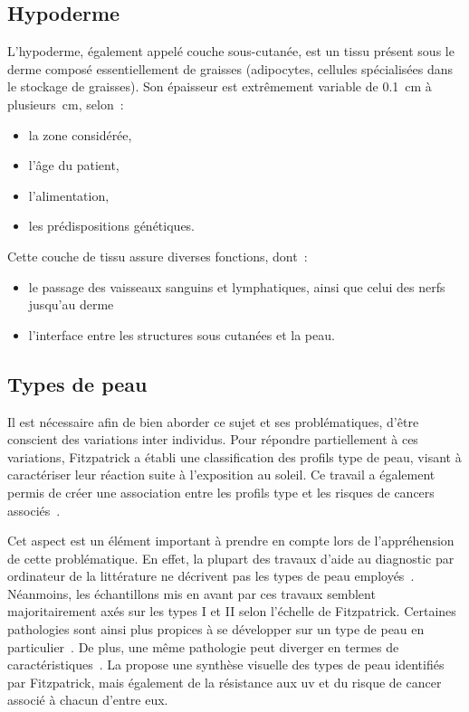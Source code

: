 \addtocounter{footnote}{1}
\clearpage

\subsection{Hypoderme}
L’hypoderme, également appelé couche sous-cutanée, est un tissu présent sous le derme composé essentiellement de graisses (adipocytes, cellules spécialisées dans le stockage de graisses). Son épaisseur est extrêmement variable de \SI{0,1}{\centi\metre} à \SI[parse-numbers = false]{plusieurs}{\centi\metre}, selon~:
\begin{itemize}
    \item la zone considérée,
    \item l’âge du patient,
    \item l’alimentation,
    \item les prédispositions génétiques.
\end{itemize}\par

Cette couche de tissu assure diverses fonctions, dont~:
\begin{itemize}
    \item le passage des vaisseaux sanguins et lymphatiques, ainsi que celui des nerfs jusqu’au derme
    \item l’interface entre les structures sous cutanées et la peau.
\end{itemize}\par

\subsection{Types de peau}
Il est nécessaire afin de bien aborder ce sujet et ses problématiques, d’être conscient des variations inter individus. Pour répondre partiellement à ces variations, Fitzpatrick a établi une classification des profils type de peau, visant à caractériser leur réaction suite à l’exposition au soleil. Ce travail a également permis de créer une association entre les profils type et les risques de cancers associés~\cite{Fitzpatrick1988}.\par

Cet aspect est un élément important à prendre en compte lors de l'appréhension de cette problématique. En effet, la plupart des travaux d'aide au diagnostic par ordinateur de la littérature ne décrivent pas les types de peau employés~\cite{Celebi2007,Wiltgen2008,Koller2010}. Néanmoins, les échantillons mis en avant par ces travaux semblent majoritairement axés sur les types I et II selon l'échelle de Fitzpatrick. Certaines pathologies sont ainsi plus propices à se développer sur un type de peau en particulier~\cite{Narayanan2010}. De plus, une même pathologie peut diverger en termes de caractéristiques~\cite{Tuma2015}. La  propose une synthèse visuelle des types de peau identifiés par Fitzpatrick, mais également de la résistance aux \gls{uv} et du risque de cancer associé à chacun d'entre eux.\par


